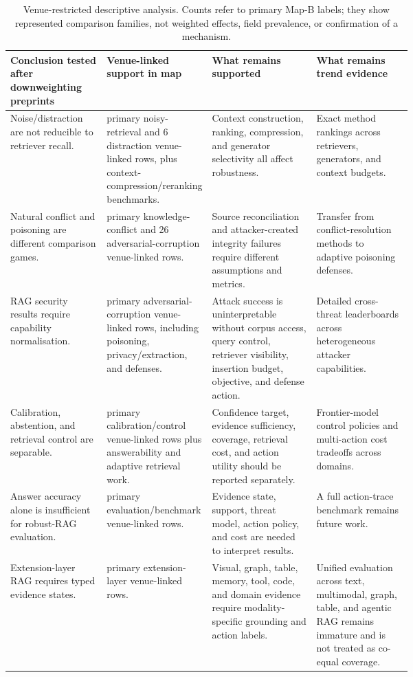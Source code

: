 \begin{table}[t]
\centering
\scriptsize
\renewcommand{\arraystretch}{0.88}
\begin{tabularx}{\linewidth}{>{\raggedright\arraybackslash}p{0.24\linewidth}>{\raggedright\arraybackslash}p{0.18\linewidth}>{\raggedright\arraybackslash}p{0.26\linewidth}X}
\toprule
\textbf{Conclusion tested after downweighting preprints} & \textbf{Venue-linked support in map} & \textbf{What remains supported} & \textbf{What remains trend evidence} \\
\midrule
Noise/distraction are not reducible to retriever recall. & 22 primary noisy-retrieval and 6 distraction venue-linked rows, plus context-compression/reranking benchmarks. & Context construction, ranking, compression, and generator selectivity all affect robustness. & Exact method rankings across retrievers, generators, and context budgets. \\
Natural conflict and poisoning are different comparison games. & 16 primary knowledge-conflict and 26 adversarial-corruption venue-linked rows. & Source reconciliation and attacker-created integrity failures require different assumptions and metrics. & Transfer from conflict-resolution methods to adaptive poisoning defenses. \\
RAG security results require capability normalisation. & 26 primary adversarial-corruption venue-linked rows, including poisoning, privacy/extraction, and defenses. & Attack success is uninterpretable without corpus access, query control, retriever visibility, insertion budget, objective, and defense action. & Detailed cross-threat leaderboards across heterogeneous attacker capabilities. \\
Calibration, abstention, and retrieval control are separable. & 20 primary calibration/control venue-linked rows plus answerability and adaptive retrieval work. & Confidence target, evidence sufficiency, coverage, retrieval cost, and action utility should be reported separately. & Frontier-model control policies and multi-action cost tradeoffs across domains. \\
Answer accuracy alone is insufficient for robust-RAG evaluation. & 28 primary evaluation/benchmark venue-linked rows. & Evidence state, support, threat model, action policy, and cost are needed to interpret results. & A full action-trace benchmark remains future work. \\
Extension-layer RAG requires typed evidence states. & 6 primary extension-layer venue-linked rows. & Visual, graph, table, memory, tool, code, and domain evidence require modality-specific grounding and action labels. & Unified evaluation across text, multimodal, graph, table, and agentic RAG remains immature and is not treated as co-equal coverage. \\
\bottomrule
\end{tabularx}
\caption{Venue-restricted descriptive analysis. Counts refer to primary Map-B labels; they show represented comparison families, not weighted effects, field prevalence, or confirmation of a mechanism.}
\label{tab:main-peer-sensitivity}
\end{table}
